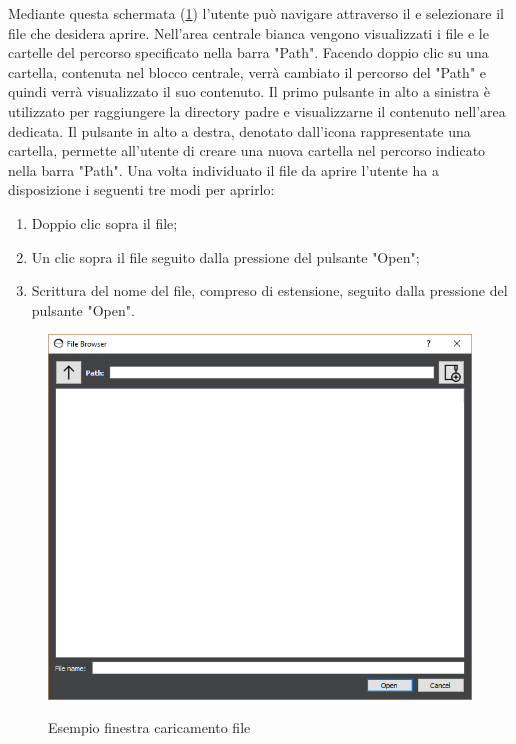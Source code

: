 		Mediante questa schermata (\ref{fig:filebrowser-load}) l'utente può navigare attraverso il  e selezionare il file che desidera aprire. 
		Nell'area centrale bianca vengono visualizzati i file e le cartelle del percorso specificato nella barra "Path". Facendo doppio clic su una cartella, contenuta nel blocco centrale, verrà cambiato il percorso del "Path" e quindi verrà visualizzato il suo contenuto.
		Il primo pulsante in alto a sinistra è utilizzato per raggiungere la directory padre e visualizzarne il contenuto nell'area dedicata.
		Il pulsante in alto a destra, denotato dall'icona rappresentate una cartella, permette all'utente di creare una nuova cartella nel percorso indicato nella barra "Path". 
		Una volta individuato il file da aprire l'utente ha a disposizione i seguenti tre modi per aprirlo:
		\begin{enumerate}
			\item{} Doppio clic sopra il file;
			\item{} Un clic sopra il file seguito dalla pressione del pulsante "Open";
			\item{} Scrittura del nome del file, compreso di estensione, seguito dalla pressione del pulsante "Open".
		\end{enumerate}
		\begin{figure}[htp]
			\caption{Esempio finestra caricamento file}
			\centering
			\includegraphics[width=\textwidth]{../img/filebrowser-load.png}
			\label{fig:filebrowser-load}
		\end{figure}

